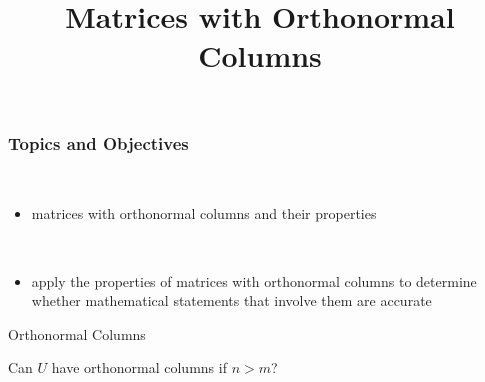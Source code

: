 \title{Matrices with Orthonormal Columns}
\subtitle{\SubTitleName}
\institute[]{\Course}
\author{\Instructor}
\maketitle   
  

 
\begin{frame}\frametitle{Topics and Objectives}
 \\
\begin{itemize}

    \item matrices with orthonormal columns and their properties
    

\end{itemize}

\vspace{0.5cm}

\\

\LearningObjectiveStatement

\begin{itemize}
    \item apply the properties of matrices with orthonormal columns to determine whether mathematical statements that involve them are accurate
    

\end{itemize}

\end{frame}






\begin{frame}{Orthonormal Columns}

    \begin{center}\end{center}

    \pause
    Can $U$ have orthonormal columns if $n > m$? 

\end{frame}





